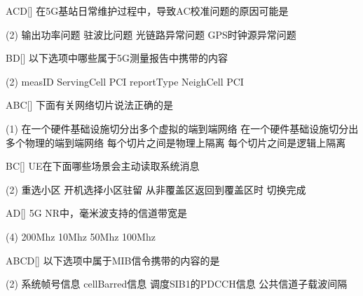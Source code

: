 \begin{choice}{\;ACD\;}[]
    在5G基站日常维护过程中，导致AC校准问题的原因可能是
    \begin{tasks}(2)
        \task 输出功率问题
        \task 驻波比问题
        \task 光链路异常问题
        \task GPS时钟源异常问题
    \end{tasks}
\end{choice}

\begin{choice}{\;BD\;}[]
    以下选项中哪些属于5G测量报告中携带的内容
    \begin{tasks}(2)
        \task measID
        \task ServingCell PCI
        \task reportType
        \task NeighCell PCI
    \end{tasks}
\end{choice}


\begin{choice}{\;ABC\;}[]
    下面有关网络切片说法正确的是
    \begin{tasks}(1)
        \task 在一个硬件基础设施切分出多个虚拟的端到端网络
        \task 在一个硬件基础设施切分出多个物理的端到端网络
        \task 每个切片之间是物理上隔离
        \task 每个切片之间是逻辑上隔离
    \end{tasks}
\end{choice}


\begin{choice}{\;BC\;}[]
    UE在下面哪些场景会主动读取系统消息
    \begin{tasks}(2)
        \task 重选小区
        \task 开机选择小区驻留
        \task 从非覆盖区返回到覆盖区时
        \task 切换完成
    \end{tasks}
\end{choice}


\begin{choice}{\;AD\;}[]
    5G NR中，毫米波支持的信道带宽是
    \begin{tasks}(4)
        \task 200Mhz
        \task 10Mhz
        \task 50Mhz
        \task 100Mhz
    \end{tasks}
\end{choice}


\begin{choice}{\;ABCD\;}[]
    以下选项中属于MIB信令携带的内容的是
    \begin{tasks}(2)
        \task 系统帧号信息
        \task cellBarred信息
        \task 调度SIB1的PDCCH信息
        \task 公共信道子载波间隔
    \end{tasks}
\end{choice}

